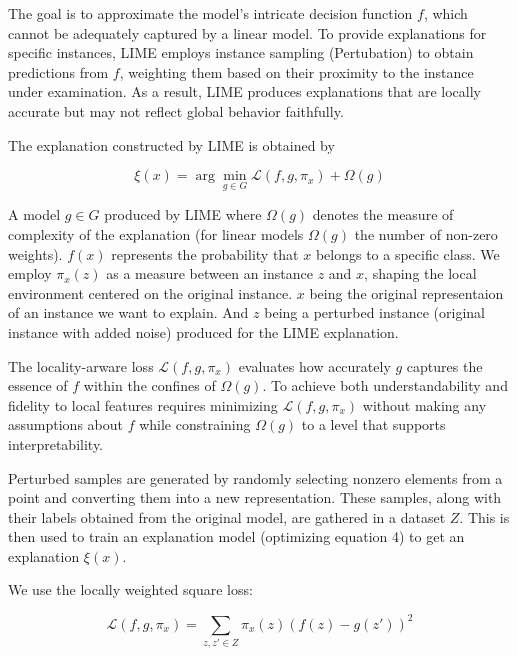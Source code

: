\documentclass{article}
\begin{document}
The goal is to approximate the model's intricate decision function $f$, which cannot be adequately captured by a linear model. To provide explanations for specific instances, LIME employs instance sampling (Pertubation) to obtain predictions from $f$, weighting them based on their proximity to the instance under examination. As a result, LIME produces explanations that are locally accurate but may not reflect global behavior faithfully.

The explanation constructed by LIME is obtained by

\begin{equation}
\xi(x) = \arg \min_{g \in G}  \mathcal{L}(f, g, \pi_x) + \Omega(g)    
\end{equation}

A model $g \in G$ produced by LIME where $\Omega(g)$ denotes the measure of complexity of the explanation (for linear models $\Omega(g)$ the number of non-zero weights). 
$f(x)$ represents the probability that $x$ belongs to a specific class.
We employ $\pi_x(z)$ as a measure between an instance $z$ and $x$, shaping the local environment centered on the original instance. 
$x$ being the original representaion of an instance we want to explain. And $z$ being a perturbed instance (original instance with added noise) produced for the LIME explanation. 

The locality-arware loss $\mathcal{L}(f, g, \pi_x)$ evaluates how accurately $g$ captures the essence of $f$ within the confines of $\Omega(g)$. 
To achieve both understandability and fidelity to local features requires minimizing $\mathcal{L}(f, g, \pi_x)$ without making any assumptions about $f$ while constraining $\Omega(g)$ to a level that supports interpretability. 

Perturbed samples are generated by randomly selecting nonzero elements from a point and converting them into a new representation. These samples, along with their labels obtained from the original model, are gathered in a dataset $Z$. This is then used to train an explanation model (optimizing equation 4) to get an explanation $\xi(x)$. 

We use the locally weighted square loss:

\begin{equation}
\mathcal{L}(f, g, \pi_x) = \sum_{z, z' \in Z } \pi_x(z)(f(z)-g(z'))^2
\end{equation}
\end{document}
